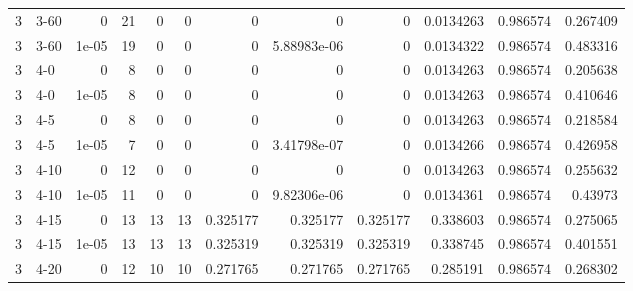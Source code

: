 \begin{tabular}{rlrrrrrrrrrr}
     3 & 3-60   &      0     &          21 &                 0 &                 0 &     0           &     0           &      0           &        0.0134263 &               0.986574 &           0.267409 \\
     3 & 3-60   &      1e-05 &          19 &                 0 &                 0 &     0           &     5.88983e-06 &      0           &        0.0134322 &               0.986574 &           0.483316 \\
     3 & 4-0    &      0     &           8 &                 0 &                 0 &     0           &     0           &      0           &        0.0134263 &               0.986574 &           0.205638 \\
     3 & 4-0    &      1e-05 &           8 &                 0 &                 0 &     0           &     0           &      0           &        0.0134263 &               0.986574 &           0.410646 \\
     3 & 4-5    &      0     &           8 &                 0 &                 0 &     0           &     0           &      0           &        0.0134263 &               0.986574 &           0.218584 \\
     3 & 4-5    &      1e-05 &           7 &                 0 &                 0 &     0           &     3.41798e-07 &      0           &        0.0134266 &               0.986574 &           0.426958 \\
     3 & 4-10   &      0     &          12 &                 0 &                 0 &     0           &     0           &      0           &        0.0134263 &               0.986574 &           0.255632 \\
     3 & 4-10   &      1e-05 &          11 &                 0 &                 0 &     0           &     9.82306e-06 &      0           &        0.0134361 &               0.986574 &           0.43973  \\
     3 & 4-15   &      0     &          13 &                13 &                13 &     0.325177    &     0.325177    &      0.325177    &        0.338603  &               0.986574 &           0.275065 \\
     3 & 4-15   &      1e-05 &          13 &                13 &                13 &     0.325319    &     0.325319    &      0.325319    &        0.338745  &               0.986574 &           0.401551 \\
     3 & 4-20   &      0     &          12 &                10 &                10 &     0.271765    &     0.271765    &      0.271765    &        0.285191  &               0.986574 &           0.268302 \\

\end{tabular}

